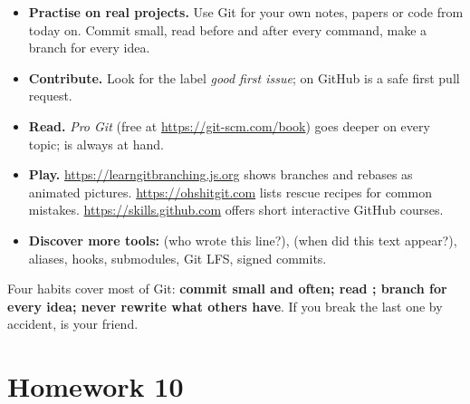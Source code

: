 \begin{itemize}
  \item \textbf{Practise on real projects.} Use Git for your own notes, papers or code from today on. Commit small, read  before and after every command, make a branch for every idea.
  \item \textbf{Contribute.} Look for the label \emph{good first issue};  on GitHub is a safe first pull request.
  \item \textbf{Read.} \emph{Pro Git} (free at \url{https://git-scm.com/book}) goes deeper on every topic;  is always at hand.
  \item \textbf{Play.} \url{https://learngitbranching.js.org} shows branches and rebases as animated pictures. \url{https://ohshitgit.com} lists rescue recipes for common mistakes. \url{https://skills.github.com} offers short interactive GitHub courses.
  \item \textbf{Discover more tools:}  (who wrote this line?),  (when did this text appear?), aliases, hooks, submodules, Git LFS, signed commits.
\end{itemize}

\begin{keyidea}
Four habits cover most of Git: \textbf{commit small and often; read ; branch for every idea; never rewrite what others have}. If you break the last one by accident,  is your friend.
\end{keyidea}

\section{Homework 10}

